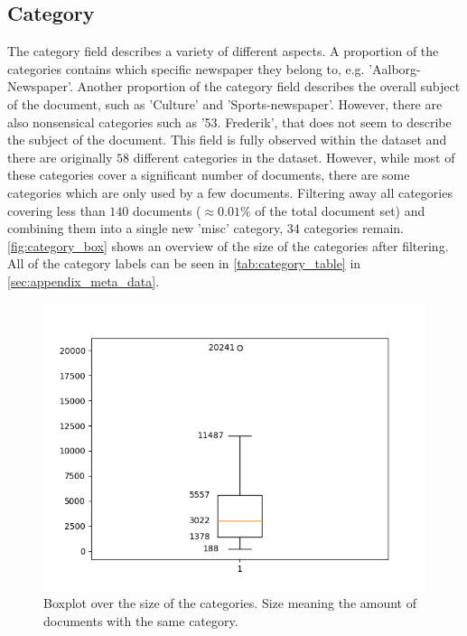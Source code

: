 \subsection{Category}
The category field describes a variety of different aspects.
A proportion of the categories contains which specific newspaper they belong to, e.g. 'Aalborg-Newspaper'.
Another proportion of the category field describes the overall subject of the document, such as 'Culture' and 'Sports-newspaper'.
However, there are also nonsensical categories such as '53. Frederik', that does not seem to describe the subject of the document.
This field is fully observed within the dataset and there are originally $58$ different categories in the dataset.
However, while most of these categories cover a significant number of documents, there are some categories which are only used by a few documents.
Filtering away all categories covering less than $140$ documents ($\approx 0.01\%$ of the total document set) and combining them into a single new 'misc' category, $34$ categories remain.
\autoref{fig:category_box} shows an overview of the size of the categories after filtering.
All of the category labels can be seen in \autoref{tab:category_table} in \autoref{sec:appendix_meta_data}.

\begin{figure}
	\centering
	\includegraphics[width=1 \linewidth]{figures/category_box.png}
	\caption{Boxplot over the size of the categories. Size meaning the amount of documents with the same category.}
	\label{fig:category_box}
\end{figure}

